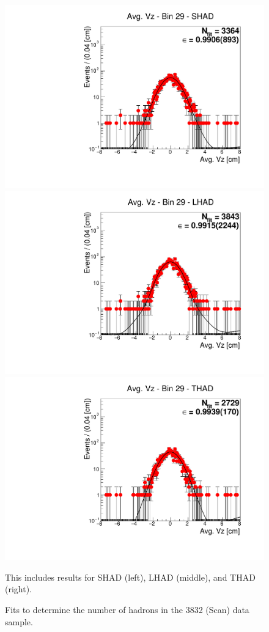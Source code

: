 \begin{figure}[H]
\centering
\includegraphics[scale=0.25]{figures/plots/nonDDbar_fit_results/scan/fit_scan_29_data_SHAD.pdf}
\hspace{-0.5cm}
\includegraphics[scale=0.25]{figures/plots/nonDDbar_fit_results/scan/fit_scan_29_data_LHAD.pdf}
\hspace{-0.5cm}
\includegraphics[scale=0.25]{figures/plots/nonDDbar_fit_results/scan/fit_scan_29_data_THAD.pdf}
\caption{Fits to determine the number of hadrons in the 3832 (Scan) data sample.}
{This includes results for SHAD (left), LHAD (middle), and THAD (right).}
\label{fig:hadron_fits_scan_29}
\end{figure}

